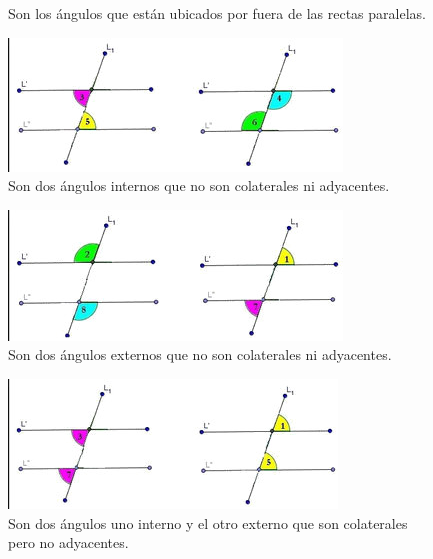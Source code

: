 \begin{tcolorbox}
\begin{tcbitemize}
\begin{figure}[H]
            \caption{Son los ángulos que están ubicados por fuera de las rectas paralelas.}
            \label{fig:angulos_externos}
        \end{figure}
        \tcbitem[title=Ángulos Alternos Internos]
        \begin{figure}[H]
            \centering
            \includegraphics[width=\linewidth]{../images/angulos_alternos_internos.jpg}
            \caption{Son dos ángulos internos que no son colaterales ni adyacentes.}
            \label{fig:angulos_alternos_internos}
        \end{figure}
        \tcbitem[title=Ángulo Alternos Externos]
        \begin{figure}[H]
            \centering
            \includegraphics[width=\linewidth]{../images/angulos_alternos_externos.jpg}
            \caption{Son dos ángulos externos que no son colaterales ni adyacentes.}
            \label{fig:angulos_alternos_externos}
        \end{figure}
        \tcbitem[title=Ángulos Correspondientes]
        \begin{figure}[H]
            \centering
            \includegraphics[width=\linewidth]{../images/angulos_correspondientes.jpg}
            \caption{Son dos ángulos uno interno y el otro externo que son colaterales pero no adyacentes.}
            \label{fig:angulos_correspondientes}
        \end{figure}
    \end{tcbitemize}
\end{tcolorbox}